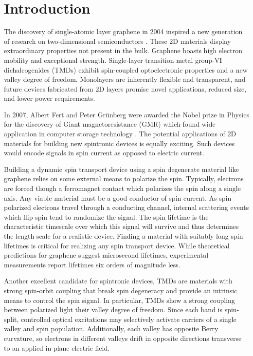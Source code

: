 \chapter{Introduction}

The discovery of single-atomic layer graphene in 2004
inspired a new generation of research on two-dimensional semiconductors
\cite{Novoselov666}.
These 2D materials display extraordinary properties not present in the bulk.
Graphene boasts high electron mobility and exceptional strength.
Single-layer transition metal group-VI dichalcogenides (TMDs)
exhibit spin-coupled optoelectronic properties
and a new valley degree of freedom.
Monolayers are inherently flexible and transparent,
and future devices fabricated from 2D layers promise
novel applications, reduced size, and lower power requirements.

In 2007, Albert Fert and Peter Grünberg were awarded
the Nobel prize in Physics for the discovery of
Giant magnetoresistance (GMR)
which found wide application in computer storage technology
\cite{PhysRevB.39.4828}.
The potential applications of 2D materials for
building new spintronic devices is equally exciting.
Such devices would encode signals in spin current
as opposed to electric current.

Building a dynamic spin transport device using a
spin degenerate material like graphene
relies on some external means to polarize the spin.
Typically, electrons are forced though a ferromagnet contact
which polarizes the spin along a single axis.
Any viable material must be a good conductor of spin current.
As spin polarized electrons travel through a conducting channel,
internal scattering events which flip spin tend to randomize the signal.
The spin lifetime is the characteristic timescale
over which this signal will survive
and thus determines the length scale for a realistic device.
Finding a material with suitably long spin lifetimes
is critical for realizing any spin transport device.
While theoretical predictions for graphene suggest microsecond lifetimes,
experimental measurements report lifetimes six orders of magnitude less.

Another excellent candidate for spintronic devices,
TMDs are materials with strong spin-orbit coupling that break spin degeneracy
and provide an intrinsic means to control the spin signal.
In particular, TMDs show a strong coupling
between polarized light their valley degree of freedom.
Since each band is spin-split, controlled optical excitations
may selectively activate carriers of a single valley and spin population.
Additionally, each valley has opposite Berry curvature, so
electrons in different valleys drift in opposite directions transverse
to an applied in-plane electric field.

